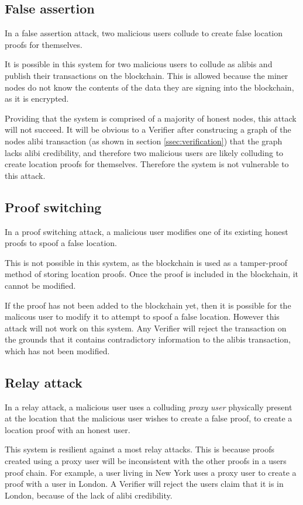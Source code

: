 \subsection{False assertion}
In a false assertion attack, two malicious users collude to create false location proofs for themselves.

It is possible in this system for two malicious users to collude as alibis and publish their transactions on the blockchain. This is allowed because the miner nodes do not know the contents of the data they are signing into the blockchain, as it is encrypted.

Providing that the system is comprised of a majority of honest nodes, this attack will not succeed. It will be obvious to a Verifier after construcing a graph of the nodes alibi transaction (as shown in section \ref{ssec:verification}) that the graph lacks alibi credibility, and therefore two malicious users are likely colluding to create location proofs for themselves. Therefore the system is not vulnerable to this attack.

\subsection{Proof switching}
In a proof switching attack, a malicious user modifies one of its existing honest proofs to spoof a false location.

This is not possible in this system, as the blockchain is used as a tamper-proof method of storing location proofs. Once the proof is included in the blockchain, it cannot be modified.

If the proof has not been added to the blockchain yet, then it is possible for the malicous user to modify it to attempt to spoof a false location. However this attack will not work on this system. Any Verifier will reject the transaction on the grounds that it contains contradictory information to the alibis transaction, which has not been modified.

\subsection{Relay attack}
In a relay attack, a malicious user uses a colluding \textit{proxy user} physically present at the location that the malicious user wishes to create a false proof, to create a location proof with an honest user.

This system is resilient against a most relay attacks. This is because proofs created using a proxy user will be inconsistent with the other proofs in a users proof chain. For example, a user living in New York uses a proxy user to create a proof with a user in London. A Verifier will reject the users claim that it is in London, because of the lack of alibi credibility.

